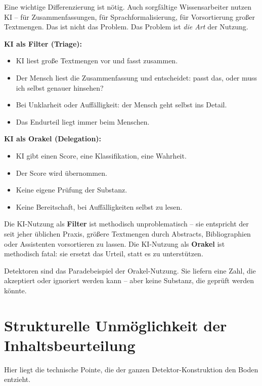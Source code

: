 Eine wichtige Differenzierung ist nötig. Auch sorgfältige
Wissensarbeiter nutzen KI -- für Zusammenfassungen, für
Sprachformalisierung, für Vorsortierung großer Textmengen. Das ist
nicht das Problem. Das Problem ist \emph{die Art} der Nutzung.

\textbf{KI als Filter (Triage):}
\begin{itemize}[leftmargin=2em,itemsep=2pt,topsep=2pt]
  \item KI liest große Textmengen vor und fasst zusammen.
  \item Der Mensch liest die Zusammenfassung und entscheidet:
        passt das, oder muss ich selbst genauer hinsehen?
  \item Bei Unklarheit oder Auffälligkeit: der Mensch geht selbst
        ins Detail.
  \item Das Endurteil liegt immer beim Menschen.
\end{itemize}

\textbf{KI als Orakel (Delegation):}
\begin{itemize}[leftmargin=2em,itemsep=2pt,topsep=2pt]
  \item KI gibt einen Score, eine Klassifikation, eine Wahrheit.
  \item Der Score wird übernommen.
  \item Keine eigene Prüfung der Substanz.
  \item Keine Bereitschaft, bei Auffälligkeiten selbst zu lesen.
\end{itemize}

Die KI-Nutzung als \textbf{Filter} ist methodisch unproblematisch
-- sie entspricht der seit jeher üblichen Praxis, größere
Textmengen durch Abstracts, Bibliographien oder Assistenten
vorsortieren zu lassen. Die KI-Nutzung als \textbf{Orakel} ist
methodisch fatal: sie ersetzt das Urteil, statt es zu unterstützen.

Detektoren sind das Paradebeispiel der Orakel-Nutzung. Sie liefern
eine Zahl, die akzeptiert oder ignoriert werden kann -- aber keine
Substanz, die geprüft werden könnte.

\section{Strukturelle Unmöglichkeit der Inhaltsbeurteilung}

Hier liegt die technische Pointe, die der ganzen Detektor-Konstruktion
den Boden entzieht.

